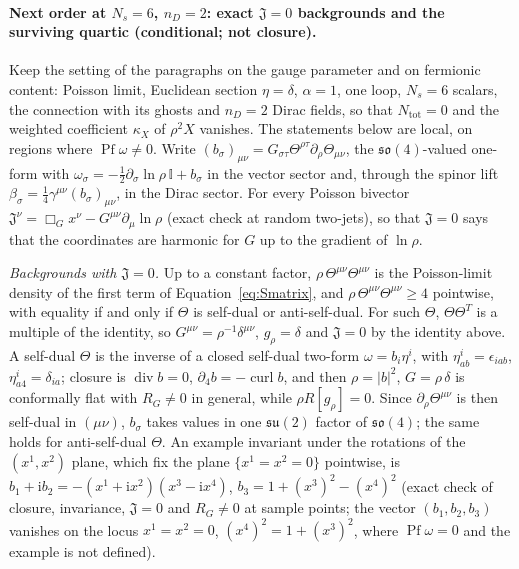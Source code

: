 \paragraph{Next order at \(N_s=6\), \(n_D=2\): exact \(\mathfrak J=0\) backgrounds and the surviving quartic (conditional; not closure).}
Keep the setting of the paragraphs on the gauge parameter and on fermionic content: Poisson limit, Euclidean section \(\eta=\delta\), \(\alpha=1\), one loop, \(N_s=6\) scalars, the connection with its ghosts and \(n_D=2\) Dirac fields, so that \(N_{\mathrm{tot}}=0\) and the weighted coefficient \(\kappa_X\) of \(\rho^2X\) vanishes. The statements below are local, on regions where \(\operatorname{Pf}\omega\ne0\). Write \((b_\sigma)_{\mu\nu}=G_{\sigma\tau}\Theta^{\rho\tau}\partial_\rho\Theta_{\mu\nu}\), the \(\mathfrak{so}(4)\)-valued one-form with \(\omega_\sigma=-\tfrac12\partial_\sigma\ln\rho\,\mathbb I+b_\sigma\) in the vector sector and, through the spinor lift \(\beta_\sigma=\tfrac14\gamma^{\mu\nu}(b_\sigma)_{\mu\nu}\), in the Dirac sector. For every Poisson bivector \(\mathfrak J^\nu=\Box_Gx^\nu-G^{\mu\nu}\partial_\mu\ln\rho\) (exact check at random two-jets), so that \(\mathfrak J=0\) says that the coordinates are harmonic for \(G\) up to the gradient of \(\ln\rho\).

\emph{Backgrounds with \(\mathfrak J=0\).} Up to a constant factor, \(\rho\,\Theta^{\mu\nu}\Theta^{\mu\nu}\) is the Poisson-limit density of the first term of Equation~\eqref{eq:Smatrix}, and \(\rho\,\Theta^{\mu\nu}\Theta^{\mu\nu}\ge4\) pointwise, with equality if and only if \(\Theta\) is self-dual or anti-self-dual. For such \(\Theta\), \(\Theta\Theta^T\) is a multiple of the identity, so \(G^{\mu\nu}=\rho^{-1}\delta^{\mu\nu}\), \(g_\rho=\delta\) and \(\mathfrak J=0\) by the identity above. A self-dual \(\Theta\) is the inverse of a closed self-dual two-form \(\omega=b_i\eta^i\), with \(\eta^i_{ab}=\epsilon_{iab}\), \(\eta^i_{a4}=\delta_{ia}\); closure is \(\operatorname{div}b=0\), \(\partial_4b=-\operatorname{curl}b\), and then \(\rho=|b|^2\), \(G=\rho\,\delta\) is conformally flat with \(R_G\ne0\) in general, while \(\rho R[g_\rho]=0\). Since \(\partial_\rho\Theta^{\mu\nu}\) is then self-dual in \((\mu\nu)\), \(b_\sigma\) takes values in one \(\mathfrak{su}(2)\) factor of \(\mathfrak{so}(4)\); the same holds for anti-self-dual \(\Theta\). An example invariant under the rotations of the \((x^1,x^2)\) plane, which fix the plane \(\{x^1=x^2=0\}\) pointwise, is \(b_1+\mathrm ib_2=-(x^1+\mathrm ix^2)(x^3-\mathrm ix^4)\), \(b_3=1+(x^3)^2-(x^4)^2\) (exact check of closure, invariance, \(\mathfrak J=0\) and \(R_G\ne0\) at sample points; the vector \((b_1,b_2,b_3)\) vanishes on the locus \(x^1=x^2=0\), \((x^4)^2=1+(x^3)^2\), where \(\operatorname{Pf}\omega=0\) and the example is not defined).

